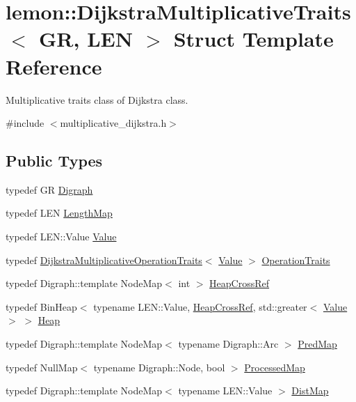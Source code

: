 \hypertarget{structlemon_1_1_dijkstra_multiplicative_traits}{}\section{lemon\+:\+:Dijkstra\+Multiplicative\+Traits$<$ GR, L\+EN $>$ Struct Template Reference}
\label{structlemon_1_1_dijkstra_multiplicative_traits}


Multiplicative traits class of Dijkstra class.  




{\ttfamily \#include $<$multiplicative\+\_\+dijkstra.\+h$>$}

\subsection*{Public Types}
\begin{DoxyCompactItemize}
\item 
typedef GR \hyperlink{structlemon_1_1_dijkstra_multiplicative_traits_a3ad6d100e3d5d097aaaac8e5733ce3a3}{Digraph}
\item 
typedef L\+EN \hyperlink{structlemon_1_1_dijkstra_multiplicative_traits_a71b3ebdd887bad38c0a80bdee34204b7}{Length\+Map}
\item 
typedef L\+E\+N\+::\+Value \hyperlink{structlemon_1_1_dijkstra_multiplicative_traits_a6e84de41f8b2d8c17974487766c465cf}{Value}
\item 
typedef \hyperlink{structlemon_1_1_dijkstra_multiplicative_operation_traits}{Dijkstra\+Multiplicative\+Operation\+Traits}$<$ \hyperlink{structlemon_1_1_dijkstra_multiplicative_traits_a6e84de41f8b2d8c17974487766c465cf}{Value} $>$ \hyperlink{structlemon_1_1_dijkstra_multiplicative_traits_affb2683da11abbf82ff4e5004046c53d}{Operation\+Traits}
\item 
typedef Digraph\+::template Node\+Map$<$ int $>$ \hyperlink{structlemon_1_1_dijkstra_multiplicative_traits_a6cf2d1691e812bc74967eb6a96bb2110}{Heap\+Cross\+Ref}
\item 
typedef Bin\+Heap$<$ typename L\+E\+N\+::\+Value, \hyperlink{structlemon_1_1_dijkstra_multiplicative_traits_a6cf2d1691e812bc74967eb6a96bb2110}{Heap\+Cross\+Ref}, std\+::greater$<$ \hyperlink{structlemon_1_1_dijkstra_multiplicative_traits_a6e84de41f8b2d8c17974487766c465cf}{Value} $>$ $>$ \hyperlink{structlemon_1_1_dijkstra_multiplicative_traits_ac1f01fa6da75e3af4ca1baabc6be06b8}{Heap}
\item 
typedef Digraph\+::template Node\+Map$<$ typename Digraph\+::\+Arc $>$ \hyperlink{structlemon_1_1_dijkstra_multiplicative_traits_aa69cc345580a8a6619b0add76aae29e0}{Pred\+Map}
\item 
typedef Null\+Map$<$ typename Digraph\+::\+Node, bool $>$ \hyperlink{structlemon_1_1_dijkstra_multiplicative_traits_a48325a83c92b35041eac397cf1728375}{Processed\+Map}
\item 
typedef Digraph\+::template Node\+Map$<$ typename L\+E\+N\+::\+Value $>$ \hyperlink{structlemon_1_1_dijkstra_multiplicative_traits_a2bc3b74c3467b4762e2ac57ea68ef78e}{Dist\+Map}
\end{DoxyCompactItemize}

